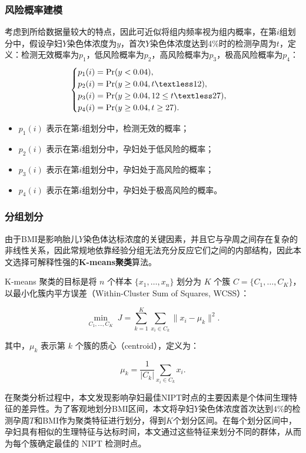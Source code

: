 \documentclass[12pt]{ctexart}
\begin{document}
	\subsubsection{风险概率建模}
 考虑到所给数据量较大的特点，因此可近似将组内频率视为组内概率，在第$i$组划分中，假设孕妇$Y$染色体浓度为$y$，首次$Y$染色体浓度达到4\%时的检测孕周为$t$，定义：检测无效概率为$p_1$，低风险概率为$p_2$，高风险概率为$p_3$，极高风险概率为$p_4$：
 \[
\begin{cases}
	p_1(i) = \Pr(y < 0.04), \\
	p_2(i) = \Pr(y \geq 0.04   , t \textless 12), \\
	p_3(i) = \Pr(y \geq 0.04   ,12 \le t \textless 27), \\
	p_4(i) = \Pr(y \geq 0.04   , t \ge 27).
\end{cases}
\]
	\begin{itemize}[noitemsep, topsep=0pt, parsep=0pt, partopsep=0pt, leftmargin=1.5em]
		\item $p_1(i)$ 表示在第$i$组划分中，检测无效的概率；
		\item  $p_2(i)$ 表示在第$i$组划分中，孕妇处于低风险的概率；
		\item  $p_3(i)$ 表示在第$i$组划分中，孕妇处于高风险的概率；
		\item  $p_4(i)$ 表示在第$i$组划分中，孕妇处于极高风险的概率。
	\end{itemize}
	
	\subsubsection{分组划分}
	由于BMI是影响胎儿$Y$染色体达标浓度的关键因素，并且它与孕周之间存在复杂的非线性关系，因此常规地依靠经验分组无法充分反应它们之间的内部结构，因此本文选择可解释性强的\textbf{K-means聚类}算法。

K-means 聚类的目标是将 \(n\) 个样本 \(\{x_1, \dots, x_n\}\) 划分为 \(K\) 个簇 \(C = \{C_1, \dots, C_K\}\)，以最小化簇内平方误差（Within-Cluster Sum of Squares, WCSS）：
	
	\[
	\min_{C_1,\dots,C_K} \;
	J = \sum_{k=1}^K \sum_{x_i \in C_k} \|x_i - \mu_k\|^2.
	\]
	
	其中，\(\mu_k\) 表示第 \(k\) 个簇的质心（centroid），定义为：
	
	\[
	\mu_k = \frac{1}{|C_k|}\sum_{x_i \in C_k} x_i.
	\]
	

	在聚类分析过程中，本文发现影响孕妇最佳NIPT时点的主要因素是个体间生理特征的差异性。为了客观地划分BMI区间，本文将孕妇$Y$染色体浓度首次达到4\%的检测孕周$T$和BMI作为聚类特征进行划分，得到$K$个划分区间。在每个划分区间中，孕妇具有相似的生理特征与达标时间，本文通过这些特征来划分不同的群体，从而为每个簇确定最佳的 NIPT 检测时点。
	
\end{document}
